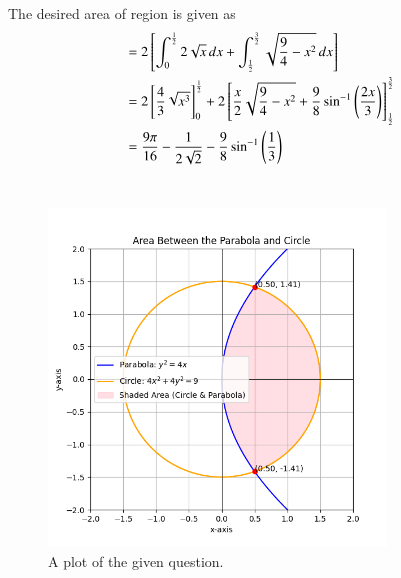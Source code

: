 \documentclass[journal]{IEEEtran}
\numberwithin{equation}{enumi}
\numberwithin{figure}{enumi}
\begin{document}
	The desired area of region is given as\\
	\begin{align*}
		&= 2{}\left[\int_{0}^{\frac{1}{2}} 2\sqrt{x} \, dx + \int_{\frac{1}{2}}^{\frac{3}{2}} \sqrt{\frac{9}{4}-x^2} \, dx\right]\\
		&= 2{}\left[\frac{4}{3}\sqrt{x^3}\right]_0^\frac{1}{2} + 2{}\left[\frac{x}{2}\sqrt{\frac{9}{4}-x^2} + \frac{9}{8}\sin^{-1}\left(\frac{2x}{3}\right)\right]_\frac{1}{2}^\frac{3}{2}\\
		&= \frac{9\pi}{16}-\frac{1}{2\sqrt{2}}-\frac{9}{8}\sin^{-1}\left(\frac{1}{3}\right)
	\end{align*}\\
	\begin{figure}[ht]
		\centering
		\includegraphics[width=0.8\textwidth]{figs/fig.png}
		\caption{A plot of the given question.}
	\end{figure}
\end{document}
